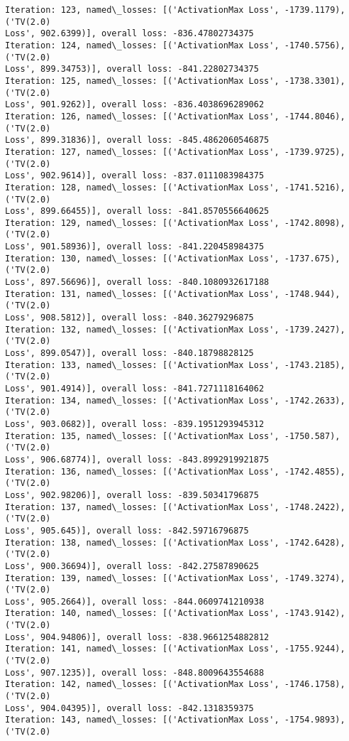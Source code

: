 \documentclass[10pt]{article}
\begin{document}
\begin{Verbatim}[commandchars=\\\{\}]
Iteration: 123, named\_losses: [('ActivationMax Loss', -1739.1179), ('TV(2.0)
Loss', 902.6399)], overall loss: -836.47802734375
Iteration: 124, named\_losses: [('ActivationMax Loss', -1740.5756), ('TV(2.0)
Loss', 899.34753)], overall loss: -841.22802734375
Iteration: 125, named\_losses: [('ActivationMax Loss', -1738.3301), ('TV(2.0)
Loss', 901.9262)], overall loss: -836.4038696289062
Iteration: 126, named\_losses: [('ActivationMax Loss', -1744.8046), ('TV(2.0)
Loss', 899.31836)], overall loss: -845.4862060546875
Iteration: 127, named\_losses: [('ActivationMax Loss', -1739.9725), ('TV(2.0)
Loss', 902.9614)], overall loss: -837.0111083984375
Iteration: 128, named\_losses: [('ActivationMax Loss', -1741.5216), ('TV(2.0)
Loss', 899.66455)], overall loss: -841.8570556640625
Iteration: 129, named\_losses: [('ActivationMax Loss', -1742.8098), ('TV(2.0)
Loss', 901.58936)], overall loss: -841.220458984375
Iteration: 130, named\_losses: [('ActivationMax Loss', -1737.675), ('TV(2.0)
Loss', 897.56696)], overall loss: -840.1080932617188
Iteration: 131, named\_losses: [('ActivationMax Loss', -1748.944), ('TV(2.0)
Loss', 908.5812)], overall loss: -840.36279296875
Iteration: 132, named\_losses: [('ActivationMax Loss', -1739.2427), ('TV(2.0)
Loss', 899.0547)], overall loss: -840.18798828125
Iteration: 133, named\_losses: [('ActivationMax Loss', -1743.2185), ('TV(2.0)
Loss', 901.4914)], overall loss: -841.7271118164062
Iteration: 134, named\_losses: [('ActivationMax Loss', -1742.2633), ('TV(2.0)
Loss', 903.0682)], overall loss: -839.1951293945312
Iteration: 135, named\_losses: [('ActivationMax Loss', -1750.587), ('TV(2.0)
Loss', 906.68774)], overall loss: -843.8992919921875
Iteration: 136, named\_losses: [('ActivationMax Loss', -1742.4855), ('TV(2.0)
Loss', 902.98206)], overall loss: -839.50341796875
Iteration: 137, named\_losses: [('ActivationMax Loss', -1748.2422), ('TV(2.0)
Loss', 905.645)], overall loss: -842.59716796875
Iteration: 138, named\_losses: [('ActivationMax Loss', -1742.6428), ('TV(2.0)
Loss', 900.36694)], overall loss: -842.27587890625
Iteration: 139, named\_losses: [('ActivationMax Loss', -1749.3274), ('TV(2.0)
Loss', 905.2664)], overall loss: -844.0609741210938
Iteration: 140, named\_losses: [('ActivationMax Loss', -1743.9142), ('TV(2.0)
Loss', 904.94806)], overall loss: -838.9661254882812
Iteration: 141, named\_losses: [('ActivationMax Loss', -1755.9244), ('TV(2.0)
Loss', 907.1235)], overall loss: -848.8009643554688
Iteration: 142, named\_losses: [('ActivationMax Loss', -1746.1758), ('TV(2.0)
Loss', 904.04395)], overall loss: -842.1318359375
Iteration: 143, named\_losses: [('ActivationMax Loss', -1754.9893), ('TV(2.0)

\end{Verbatim}
\end{document}
